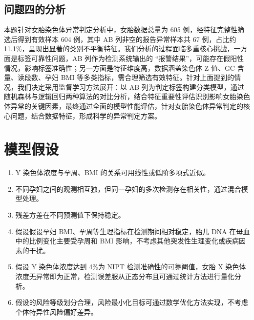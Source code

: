 \documentclass[withoutpreface,bwprint]{cumcmthesis} %
\begin{document}
\subsection{问题四的分析}
本题针对女胎染色体异常判定分析中，女胎数据总量为 605 例，经特征完整性筛选后得到有效样本 604 例，其中 AB 列非空的报告异常样本共 67 例，占比约 11.1\%，呈现出显著的类别不平衡特征。我们分析的过程面临多重核心挑战，一方面是标签可靠性问题，AB 列作为检测系统输出的 “报警结果”，可能存在假阳性情况，影响标签准确性；另一方面是特征维度高，数据涵盖染色体 Z 值、GC 含量、读段数、孕妇 BMI 等多类指标，需合理筛选有效特征。针对上面提到的情况，我们决定采用监督学习方法展开：以 AB 列为判定标签构建分类模型，通过随机森林与逻辑回归两种算法的对比分析，结合特征重要性评估识别影响女胎染色体异常的关键因素，最终通过全面的模型性能评估，针对女胎染色体异常判定的核心问题，结合数据特征，形成科学的异常判定方案。

\section{模型假设}
\begin{enumerate}
    \item Y 染色体浓度与孕周、BMI 的关系可用线性或低阶多项式近似。
    \item 不同孕妇之间的观测相互独，但同一孕妇的多次检测存在相关性，通过混合模型处理。
    \item 残差方差在不同预测值下保持稳定。
    \item 假设假设孕妇 BMI、孕周等生理指标在检测期间相对稳定，胎儿 DNA 在母血中的比例变化主要受孕周和 BMI 影响，不考虑其他突发性生理变化或疾病因素的干扰。
    \item 假设 Y 染色体浓度达到 4\%为 NIPT 检测准确性的可靠阈值，女胎 X 染色体浓度无异常即为正常，检测误差服从正态分布且可通过统计方法进行量化分析。
    \item 假设的风险等级划分合理，风险最小化目标可通过数学优化方法实现，不考虑个体特异性风险偏好差异。
\end{enumerate}

\end{document}
